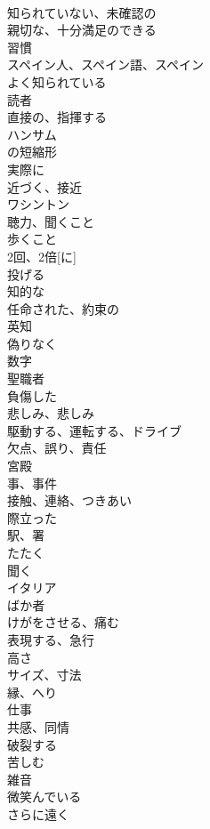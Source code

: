 \documentclass[8pt]{extreport}
\begin{document}
\begin{CJK}{UTF8}{min}
\\	知られていない、未確認の	
\\	親切な、十分満足のできる	
\\	習慣	
\\	スペイン人、スペイン語、スペイン	
\\	よく知られている	
\\	読者	
\\	直接の、指揮する	
\\	ハンサム	
\\	の短縮形	
\\	実際に	
\\	近づく、接近	
\\	ワシントン	
\\	聴力、聞くこと	
\\	歩くこと	
\\	2回、2倍[に]	
\\	投げる	
\\	知的な	
\\	任命された、約束の	
\\	英知	
\\	偽りなく	
\\	数字	
\\	聖職者	
\\	負傷した	
\\	悲しみ、悲しみ	
\\	駆動する、運転する、ドライブ	
\\	欠点、誤り、責任	
\\	宮殿	
\\	事、事件	
\\	接触、連絡、つきあい	
\\	際立った	
\\	駅、署	
\\	たたく	
\\	聞く	
\\	イタリア	
\\	ばか者	
\\	けがをさせる、痛む	
\\	表現する、急行	
\\	高さ	
\\	サイズ、寸法	
\\	縁、へり	
\\	仕事	
\\	共感、同情	
\\	破裂する	
\\	苦しむ	
\\	雑音	
\\	微笑んでいる	
\\	さらに遠く	

\end{CJK}
\end{document}
